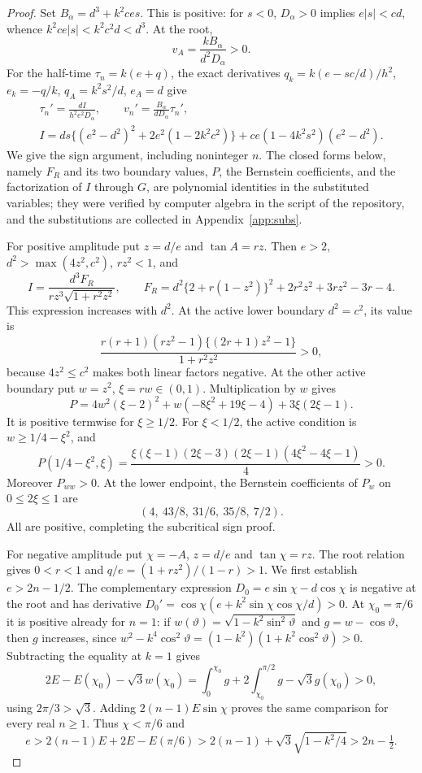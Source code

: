 \documentclass[11pt,a4paper]{article}
\theoremstyle{remark}\newtheorem{remark}[theorem]{Remark}
\begin{document}
\begin{proof}
Set $B_\alpha=d^3+k^2ces$. This is positive: for $s<0$,
$D_\alpha>0$ implies $e|s|<cd$, whence
$k^2ce|s|<k^2c^2d<d^3$. At the root,
\[
 v_A=\frac{kB_\alpha}{d^2D_\alpha}>0.
\]
For the half-time $\tau_n=k(e+q)$, the exact derivatives
$q_k=k(e-sc/d)/h^2$, $e_k=-q/k$, $q_A=k^2s^2/d$, $e_A=d$
give
\begin{equation}\label{eq:zero-time-bridge}
 \begin{gathered}
 \tau_n'=\frac{dI}{h^2e^2D_\alpha},\qquad
 v_n'=\frac{B_\alpha}{dD_\alpha}\tau_n',\\
 I=ds\{(e^2-d^2)^2+2e^2(1-2k^2c^2)\}
       +ce(1-4k^2s^2)(e^2-d^2).
 \end{gathered}
\end{equation}
We give the sign argument, including noninteger $n$. The closed forms
below, namely $F_R$ and its two boundary values, $P$, the Bernstein
coefficients, and the factorization of $I$ through $G$, are polynomial
identities in the substituted variables; they were verified by computer
algebra in the script  of the
repository, and the substitutions are collected in
Appendix~\ref{app:subs}.

For positive amplitude put $z=d/e$ and $\tan A=rz$. Then
$e>2$, $d^2>\max(4z^2,c^2)$, $rz^2<1$, and
\[
 I=\frac{d^3F_R}{rz^3\sqrt{1+r^2z^2}},\qquad
 F_R=d^2\{2+r(1-z^2)\}^2+2r^2z^2+3rz^2-3r-4.
\]
This expression increases with $d^2$. At the active lower boundary
$d^2=c^2$, its value is
\[
 \frac{r(r+1)(rz^2-1)\{(2r+1)z^2-1\}}{1+r^2z^2}>0,
\]
because $4z^2\le c^2$ makes both linear factors negative.
At the other active boundary put $w=z^2$, $\xi=rw\in(0,1)$.
Multiplication by $w$ gives
\[
 P=4w^2(\xi-2)^2+w(-8\xi^2+19\xi-4)+3\xi(2\xi-1).
\]
It is positive termwise for $\xi\ge1/2$. For $\xi<1/2$, the active
condition is $w\ge1/4-\xi^2$, and
\[
 P(1/4-\xi^2,\xi)=\frac{\xi(\xi-1)(2\xi-3)(2\xi-1)(4\xi^2-4\xi-1)}4>0.
\]
Moreover $P_{ww}>0$. At the lower endpoint, the Bernstein coefficients
of $P_w$ on $0\le2\xi\le1$ are
\[
 (4,\ 43/8,\ 31/6,\ 35/8,\ 7/2).
\]
All are positive, completing the subcritical sign proof.

For negative amplitude put $\chi=-A$, $z=d/e$ and $\tan\chi=rz$.
The root relation gives $0<r<1$ and $q/e=(1+rz^2)/(1-r)>1$.
We first establish $e>2n-1/2$. The complementary expression
$D_0=e\sin\chi-d\cos\chi$ is negative at the root and has derivative
$D_0'=\cos\chi(e+k^2\sin\chi\cos\chi/d)>0$.
At $\chi_0=\pi/6$ it is positive already for $n=1$: if
$w(\vartheta)=\sqrt{1-k^2\sin^2\vartheta}$ and $g=w-\cos\vartheta$, then
$g$ increases, since
$w^2-k^4\cos^2\vartheta=(1-k^2)(1+k^2\cos^2\vartheta)>0$.
Subtracting the equality at $k=1$ gives
\[
 2E-E(\chi_0)-\sqrt3w(\chi_0)
 =\int_0^{\chi_0}g+2\int_{\chi_0}^{\pi/2}g-\sqrt3g(\chi_0)>0,
\]
using $2\pi/3>\sqrt3$. Adding $2(n-1)E\sin\chi$ proves the
same comparison for every real $n\ge1$. Thus $\chi<\pi/6$ and
\[
 e>2(n-1)E+2E-E(\pi/6)
   >2(n-1)+\sqrt3\sqrt{1-k^2/4}>2n-\tfrac12.
\]


\end{proof}
\end{document}
